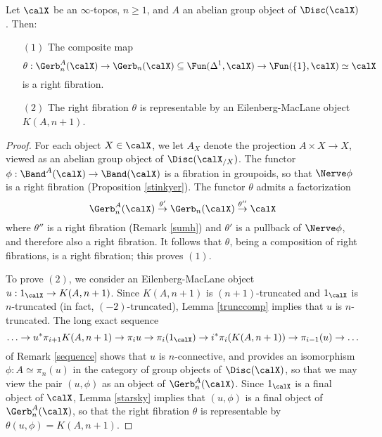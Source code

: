 \begin{theorem}\label{starthm}
Let $\calX$ be an $\infty$-topos, $n \geq 1$, and $A$ an abelian group object of
$\Disc( \calX)$. Then:

\begin{itemize}
\item[$(1)$] The composite map
$$ \theta: \Gerb_n^{A}(\calX) \rightarrow \Gerb_n(\calX) \subseteq \Fun(\Delta^1,\calX) \rightarrow
\Fun(\{1\}, \calX) \simeq \calX $$ is a right fibration.

\item[$(2)$] The right fibration $\theta$ is representable by an Eilenberg-MacLane object
$K(A,n+1)$. 
\end{itemize}
\end{theorem}

\begin{proof}
For each object $X \in \calX$, we let $A_{X}$ denote the projection $A \times X \rightarrow X$, viewed as an abelian group object of $\Disc( \calX_{/X})$.  
The functor $\phi: \Band^{A}(\calX) \rightarrow \Band(\calX)$
is a fibration in groupoids, so that $\Nerve \phi$ is a right fibration (Proposition \ref{stinkyer}). 
The functor $\theta$ admits a factorization
$$ \Gerb_n^{A}(\calX) \stackrel{\theta'}{\rightarrow} \Gerb_n(\calX) \stackrel{\theta''}{\rightarrow} \calX$$
where $\theta''$ is a right fibration (Remark \ref{sumh}) and $\theta'$ is a pullback of
$\Nerve \phi$, and therefore also a right fibration. It follows that $\theta$, being a composition of right fibrations, is a right fibration; this proves $(1)$.

To prove $(2)$, we consider an Eilenberg-MacLane object $u: 1_{\calX} \rightarrow K(A,n+1)$.
Since $K(A,n+1)$ is $(n+1)$-truncated and $1_{\calX}$ is $n$-truncated (in fact, $(-2)$-truncated), 
Lemma \ref{trunccomp} implies that $u$ is $n$-truncated. 
The long exact sequence
$$\ldots \rightarrow u^{\ast} \pi_{i+1} K(A,n+1) \rightarrow \pi_i u \rightarrow \pi_i(1_{\calX}) \rightarrow i^{\ast}
\pi_i( K(A,n+1) ) \rightarrow \pi_{i-1}(u) \rightarrow \ldots$$
of Remark \ref{sequence} shows that $u$ is $n$-connective, and provides an
isomorphism $\phi: A \simeq \pi_n(u)$ in the category of group objects of $\Disc( \calX)$,
so that we may view the pair $(u,\phi)$ as an object of $\Gerb_n^{A}(\calX)$. Since
$1_{\calX}$ is a final object of $\calX$, Lemma \ref{starsky} implies that $(u,\phi)$ 
is a final object of $\Gerb_n^{A}(\calX)$, so that the right fibration $\theta$ is representable
by $\theta(u,\phi) = K(A,n+1)$.
\end{proof}

